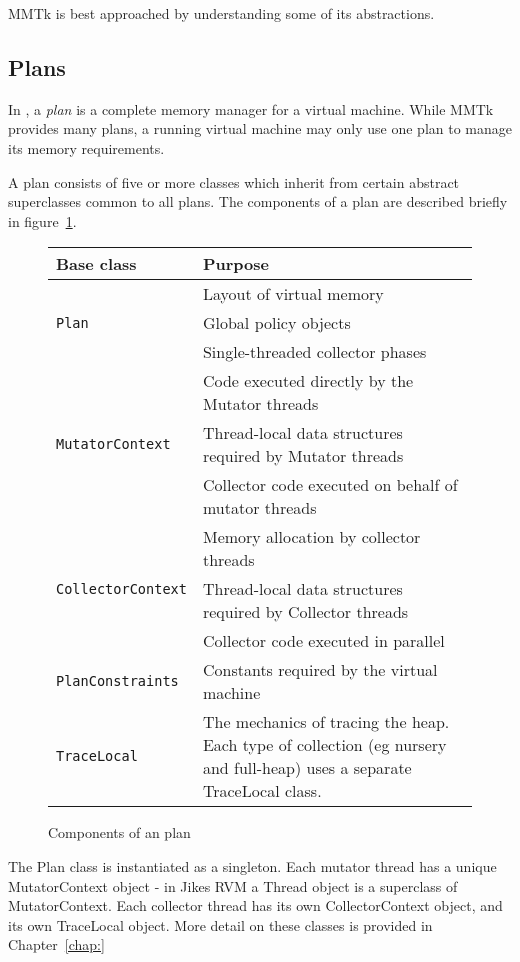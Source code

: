 MMTk is best approached by understanding some of its abstractions.

\subsection{Plans}

In \mmtk, a \emph{plan} is a complete memory manager for a virtual
machine.  While MMTk provides many plans, a running virtual machine
may only use one plan to manage its memory requirements.  

A plan consists of five or more classes which inherit from certain
abstract superclasses common to all plans.  
The components of a plan are described briefly in figure~\ref{fig:intro:plan}.

\begin{figure}
\begin{tabular}{|l|p{9cm}|}
\hline
Base class & Purpose \\
\hline
\multirow{3}{*}{\lstinline|Plan|} & Layout of virtual memory  \\
& Global policy objects \\
& Single-threaded collector phases \\ \hline
\multirow{3}{*}{\lstinline|MutatorContext|}  & Code executed directly by the Mutator threads \\
& Thread-local data structures required by Mutator threads \\
& Collector code executed on behalf of mutator threads \\ \hline
\multirow{3}{*}{\lstinline|CollectorContext|} & Memory allocation by collector threads \\
& Thread-local data structures required by Collector threads \\ 
& Collector code executed in parallel \\ \hline
\lstinline|PlanConstraints|  & Constants required by the virtual machine \\ \hline
\lstinline|TraceLocal| & The mechanics of tracing the heap.  Each type of collection
(eg nursery and full-heap) uses a separate TraceLocal class.  \\ \hline
\end{tabular}
\caption{Components of an \mmtk plan}
\label{fig:intro:plan}
\end{figure}

The Plan class is instantiated as a singleton.  Each mutator thread has a unique MutatorContext object - in Jikes RVM 
a Thread object is a superclass of MutatorContext.  Each collector thread has its own CollectorContext object, and
its own TraceLocal object.  More detail on these classes is provided in Chapter~\ref{chap:}
%
% 

